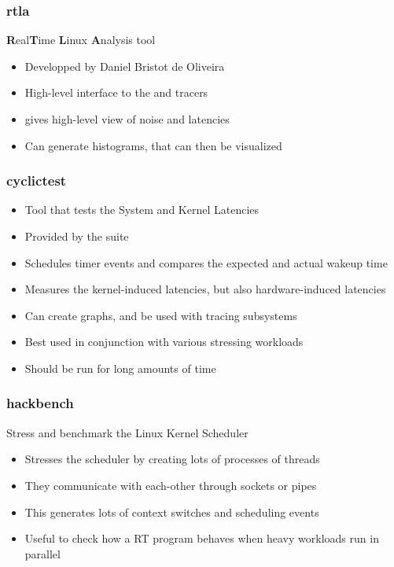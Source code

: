 \begin{frame}
	\frametitle{rtla}
	\textbf{R}eal\textbf{T}ime \textbf{L}inux \textbf{A}nalysis tool
	\begin{itemize}
		\item Developped by Daniel Bristot de Oliveira
		\item High-level interface to the  and  tracers
		\item {} gives high-level view of noise and latencies
		\item Can generate histograms, that can then be visualized
	\end{itemize}

\end{frame}

\begin{frame}
	\frametitle{cyclictest}
	\begin{itemize}
		\item Tool that tests the System and Kernel Latencies
		\item Provided by the  suite
		\item Schedules timer events and compares the expected and actual wakeup time
		\item Measures the kernel-induced latencies, but also hardware-induced latencies
		\item Can create graphs, and be used with tracing subsystems
		\item Best used in conjunction with various stressing workloads
		\item Should be run for long amounts of time
	\end{itemize}
\end{frame}

\begin{frame}
	\frametitle{hackbench}
	Stress and benchmark the Linux Kernel Scheduler
	\begin{itemize}
		\item Stresses the scheduler by creating lots of processes of threads
		\item They communicate with each-other through sockets or pipes
		\item This generates lots of context switches and scheduling events
		\item Useful to check how a RT program behaves when heavy workloads run in parallel
	\end{itemize}
\end{frame}

